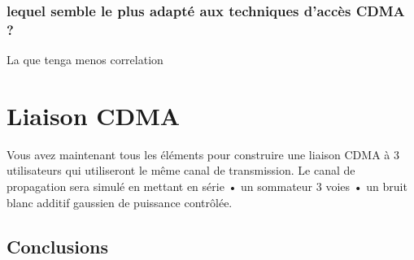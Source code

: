 \documentclass{report}
\begin{document}
%
%
\subsection{ lequel semble le plus adapté aux techniques d'accès CDMA ?}

La que tenga menos correlation
\chapter{Liaison CDMA}%

Vous avez maintenant tous les éléments pour construire une liaison CDMA à 3 utilisateurs qui
utiliseront le même canal de transmission. Le canal de propagation sera simulé en mettant en
série
• un sommateur 3 voies
• un bruit blanc additif gaussien de puissance contrôlée.







\section{Conclusions}










\end{document}
